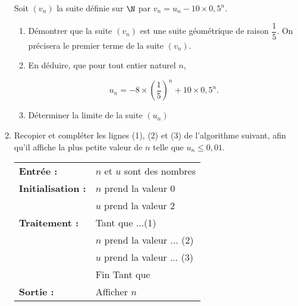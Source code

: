\documentclass{cornouaille}
\begin{document}
\begin{exercice}
\begin{enumerate}
Soit $\left(v_{n}\right)$ la suite définie sur $\N$ par $v_{n} = u_{n} - 10 \times  0,5^n$. 
	\begin{enumerate}
		\item Démontrer que la suite $\left(v_{n}\right)$ est une suite géométrique de raison $\dfrac{1}{5}$. On précisera le  
premier terme de la suite $\left(v_{n}\right)$. 
		\item En déduire, que pour tout entier naturel $n$,
 
\[u_{n} = - 8 \times  \left(\dfrac{1}{5}\right)^n + 10 \times  0,5^n.\]
 
		\item Déterminer la limite de la suite $\left(u_{n}\right)$
	\end{enumerate} 
\item Recopier et compléter les lignes (1), (2) et (3) de l'algorithme suivant, afin qu'il affiche la plus petite valeur de $n$ telle que $u_{n} \leqslant  0,01$.
\begin{center}
\begin{tabularx}{0.6\linewidth}{|l X|} \hline
\textbf{Entrée :}& $n$ et $u$ sont des nombres\\ 
\textbf{Initialisation :}& $n$ prend la valeur 0\\
& $u$ prend la valeur 2\\  
\textbf{Traitement :}&Tant que ...\hfill (1)\\  
	&\hspace{0,5cm} $n$ prend la valeur ... 	\hfill(2)\\ 
	&\hspace{0,5cm} $u$ prend la valeur ... 	\hfill(3)\\ 
&Fin Tant que\\ 
\textbf{Sortie :}&Afficher $n$\\ \hline 
\end{tabularx}
\end{center}
\end{enumerate}
\end{exercice}
\end{document}
